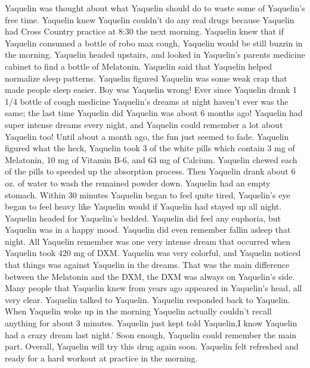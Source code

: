 \documentclass[12pt]{book}
\begin{document}
Yaquelin was thought about what Yaquelin should do to waste some of Yaquelin's free time. Yaquelin knew Yaquelin couldn't do any real drugs because Yaquelin had Cross Country practice at 8:30 the next morning. Yaquelin knew that if Yaquelin consumed a bottle of robo max cough, Yaquelin would be still buzzin in the morning. Yaquelin headed upstairs, and looked in Yaquelin's parents medicine cabinet to find a bottle of Melatonin. Yaquelin said that Yaquelin helped normalize sleep patterns. Yaquelin figured Yaquelin was some weak crap that made people sleep easier. Boy was Yaquelin wrong! Ever since Yaquelin drank 1 1/4 bottle of cough medicine Yaquelin's dreams at night haven't ever was the same; the last time Yaquelin did Yaquelin was about 6 months ago! Yaquelin had super intense dreams every night, and Yaquelin could remember a lot about Yaquelin too! Until about a month ago, the fun just seemed to fade. Yaquelin figured what the heck, Yaquelin took 3 of the white pills which contain 3 mg of Melatonin, 10 mg of Vitamin B-6, and 63 mg of Calcium. Yaquelin chewed each of the pills to speeded up the absorption process. Then Yaquelin drank about 6 oz. of water to wash the remained powder down. Yaquelin had an empty stomach. Within 30 minutes Yaquelin began to feel quite tired, Yaquelin's eye began to feel heavy like Yaquelin would if Yaquelin had stayed up all night. Yaquelin headed for Yaquelin's bedded. Yaquelin did feel any euphoria, but Yaquelin was in a happy mood. Yaquelin did even remember fallin asleep that night. All Yaquelin remember was one very intense dream that occurred when Yaquelin took 420 mg of DXM. Yaquelin was very colorful, and Yaquelin noticed that things was against Yaquelin in the dreams. That was the main difference between the Melatonin and the DXM, the DXM was always on Yaquelin's side. Many people that Yaquelin knew from years ago appeared in Yaquelin's head, all very clear. Yaquelin talked to Yaquelin. Yaquelin responded back to Yaquelin. When Yaquelin woke up in the morning Yaquelin actually couldn't recall anything for about 3 minutes. Yaquelin just kept told Yaquelin,I know Yaquelin had a crazy dream last night.' Soon enough, Yaquelin could remember the main part. Overall, Yaquelin will try this drug again soon. Yaquelin felt refreshed and ready for a hard workout at practice in the morning.
\end{document}
